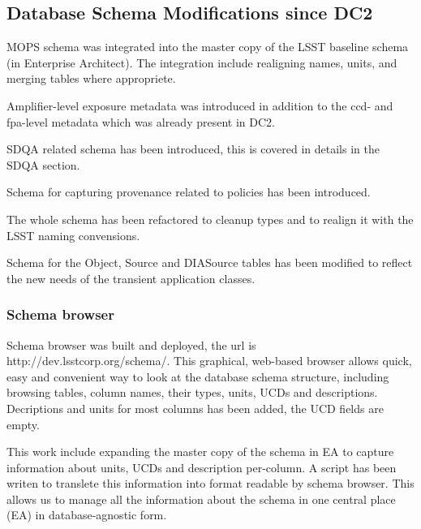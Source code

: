 
\subsection{Database Schema Modifications since DC2}


MOPS schema was integrated into the master copy of the
LSST baseline schema (in Enterprise Architect). The 
integration include realigning names, units, and 
merging tables where appropriete.


Amplifier-level exposure metadata was introduced
in addition to the ccd- and fpa-level metadata which 
was already present in DC2.


SDQA related schema has been introduced, this is 
covered in details in the SDQA section.


Schema for capturing provenance related to policies
has been introduced.


The whole schema has been refactored to cleanup types
and to realign it with the LSST naming convensions.


Schema for the Object, Source and DIASource tables 
has been modified to reflect the new needs of the 
transient application classes.


\subsubsection {Schema browser}

Schema browser was built and deployed, the url is
http://dev.lsstcorp.org/schema/. This graphical, web-based
browser allows quick, easy and convenient way to look
at the database schema structure, including browsing tables, 
column names, their types, units, UCDs and descriptions.
Decriptions and units for most columns has been added,
the UCD fields are empty.

This work include expanding the master copy of the schema 
in EA to capture information about units, UCDs and description
per-column. A script has been writen to translete this 
information into format readable by schema browser. 
This allows us to manage all the information about the schema 
in one central place (EA) in database-agnostic form.



